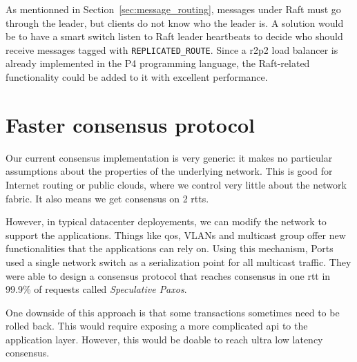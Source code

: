 As mentionned in Section~\ref{sec:message_routing}, messages under Raft must go through the leader, but clients do not know who the leader is.
A solution would be to have a smart switch listen to Raft leader heartbeats to decide who should receive messages tagged with \texttt{REPLICATED\_ROUTE}.
Since a \gls{r2p2} load balancer is already implemented in the P4 programming language\cite{r2p2}, the Raft-related functionality could be added to it with excellent performance.


\section{Faster consensus protocol}

Our current consensus implementation is very generic: it makes no particular assumptions about the properties of the underlying network.
This is good for Internet routing or public clouds, where we control very little about the network fabric.
It also means we get consensus on 2 \glspl{rtt}.

However, in typical datacenter deployements, we can modify the network to support the applications.
Things like \gls{qos}, VLANs and multicast group offer new functionalities that the applications can rely on.
Using this mechanism, Ports \etal used a single network switch as a serialization point for all multicast traffic.
They were able to design a consensus protocol that reaches consensus in one \gls{rtt} in 99.9\% of requests called \emph{Speculative Paxos}\cite{specpaxos}.

One downside of this approach is that some transactions sometimes need to be rolled back.
This would require exposing a more complicated \gls{api} to the application layer.
However, this would be doable to reach ultra low latency consensus.

